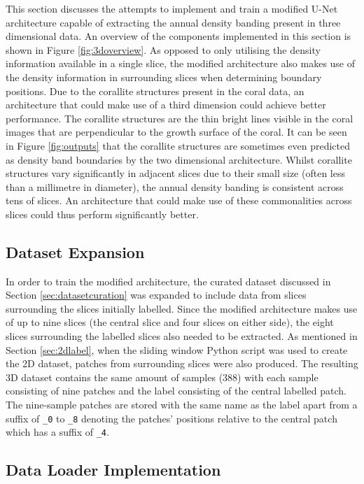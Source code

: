 This section discusses the attempts to implement and train a modified U-Net architecture capable of extracting the annual density banding present in three dimensional data. An overview of the components implemented in this section is shown in Figure \ref{fig:3doverview}. As opposed to only utilising the density information available in a single slice, the modified architecture also makes use of the density information in surrounding slices when determining boundary positions. Due to the corallite structures present in the coral data, an architecture that could make use of a third dimension could achieve better performance. The corallite structures are the thin bright lines visible in the coral images that are perpendicular to the growth surface of the coral. It can be seen in Figure \ref{fig:outputs} that the corallite structures are sometimes even predicted as density band boundaries by the two dimensional architecture. Whilst corallite structures vary significantly in adjacent slices due to their small size (often less than a millimetre in diameter), the annual density banding is consistent across tens of slices. An architecture that could make use of these commonalities across slices could thus perform significantly better.

\subsection{Dataset Expansion}

In order to train the modified architecture, the curated dataset discussed in Section \ref{sec:datasetcuration} was expanded to include data from slices surrounding the slices initially labelled. Since the modified architecture makes use of up to nine slices (the central slice and four slices on either side), the eight slices surrounding the labelled slices also needed to be extracted. As mentioned in Section \ref{sec:2dlabel}, when the sliding window Python script was used to create the 2D dataset, patches from surrounding slices were also produced. The resulting 3D dataset contains the same amount of samples (388) with each sample consisting of nine patches and the label consisting of the central labelled patch. The nine-sample patches are stored with the same name as the label apart from a suffix of \texttt{\_0} to \texttt{\_8} denoting the patches' positions relative to the central patch which has a suffix of \texttt{\_4}.

\subsection{Data Loader Implementation}

